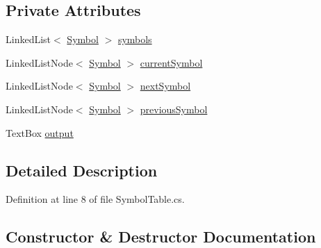 \subsection*{Private Attributes}
\begin{DoxyCompactItemize}
\item 
Linked\+List$<$ \hyperlink{class_c_p_u___o_s___simulator_1_1_compiler_1_1_frontend_1_1_symbols_1_1_symbol}{Symbol} $>$ \hyperlink{class_c_p_u___o_s___simulator_1_1_compiler_1_1_frontend_1_1_symbols_1_1_symbol_table_a3a69b239234ec68d9225217c4a4b1eb7}{symbols}
\item 
Linked\+List\+Node$<$ \hyperlink{class_c_p_u___o_s___simulator_1_1_compiler_1_1_frontend_1_1_symbols_1_1_symbol}{Symbol} $>$ \hyperlink{class_c_p_u___o_s___simulator_1_1_compiler_1_1_frontend_1_1_symbols_1_1_symbol_table_a2fc3932216a6a0a499d47bc29a2b03c3}{current\+Symbol}
\item 
Linked\+List\+Node$<$ \hyperlink{class_c_p_u___o_s___simulator_1_1_compiler_1_1_frontend_1_1_symbols_1_1_symbol}{Symbol} $>$ \hyperlink{class_c_p_u___o_s___simulator_1_1_compiler_1_1_frontend_1_1_symbols_1_1_symbol_table_aae0b08c3eb5d6ada83e944352bc77ebb}{next\+Symbol}
\item 
Linked\+List\+Node$<$ \hyperlink{class_c_p_u___o_s___simulator_1_1_compiler_1_1_frontend_1_1_symbols_1_1_symbol}{Symbol} $>$ \hyperlink{class_c_p_u___o_s___simulator_1_1_compiler_1_1_frontend_1_1_symbols_1_1_symbol_table_a40b980c535cb45d6946762cb21112fb2}{previous\+Symbol}
\item 
Text\+Box \hyperlink{class_c_p_u___o_s___simulator_1_1_compiler_1_1_frontend_1_1_symbols_1_1_symbol_table_a296a865c0445d3282c0b211853df56db}{output}
\end{DoxyCompactItemize}


\subsection{Detailed Description}


Definition at line 8 of file Symbol\+Table.\+cs.



\subsection{Constructor \& Destructor Documentation}
\hypertarget{class_c_p_u___o_s___simulator_1_1_compiler_1_1_frontend_1_1_symbols_1_1_symbol_table_a3198555072680916b69483d09f8a23ca}{}
